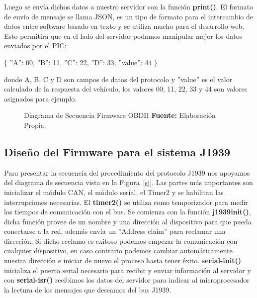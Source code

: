 Luego se envía dichos datos a nuestro servidor con la función {\bfseries print()}. 
El formato de envío de mensaje se llama JSON, es un tipo de formato para el intercambio de datos entre software basado en texto y se utiliza mucho para el desarrollo web. 
Esto permitirá que en el lado del servidor podamos manipular mejor los datos enviados por el PIC: 

\{
	''A'':  00, 
	''B'': 11, 
	''C'': 22, 
	''D'': 33, 
	''value'': 44 \}

donde A, B, C y D son campos de datos del protocolo y ''value'' es el valor calculado de la respuesta del vehículo, los valores 00, 11, 22, 33 y 44 son valores asignados para ejemplo. 

 




\begin{figure}[H]
	\centering
	\begin{center}
		
	\end{center}
	\caption[Diagrama de Secuencia Firmware OBDII.]{Diagrama de Secuencia Firmware OBDII \textbf{ Fuente:} Elaboración Propia.}
	\label{sobd} %
\end{figure}



\subsection{Diseño del Firmware para el sistema J1939}

Para presentar la secuencia del procedimiento del protocolo J1939 nos apoyamos del diagrama de secuencia vista en la Figura~\ref{sj}.
Las partes más importantes son inicializar el módulo CAN, el módulo serial, el Timer2 y se habilitan las interrupciones necesarias. 
El {\bfseries timer2()} se utiliza como temporizador para medir los tiempos de comunicación con el bus. 
Se comienza con la función {\bfseries j1939init()}, dicha función provee de un nombre y una dirección al dispositivo para que pueda conectarse a la red, además envía un ''Address claim'' para reclamar una dirección. 
Si dicho reclamo es exitoso podemos empezar la comunicación con cualquier dispositivo, en caso contrario podemos cambiar automáticamente nuestra dirección e iniciar de nuevo el proceso hasta tener éxito. 
{\bfseries serial-init()} inicializa el puerto serial necesario para recibir y enviar información al servidor y con {\bfseries serial-isr() } recibimos los datos del servidor para indicar al microprocesador la lectura de los mensajes que deseamos del bus J1939. 

